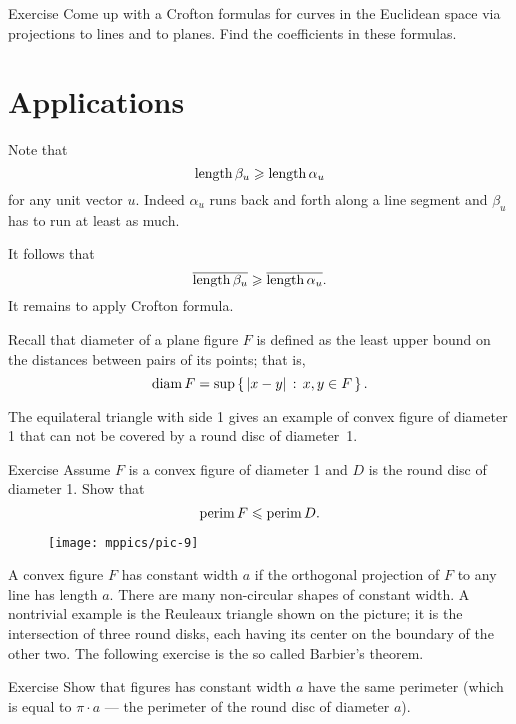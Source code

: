 \begin{thm}{Exercise}
Come up with a Crofton formulas for curves in the Euclidean space via projections to lines and to planes.
Find the coefficients in these formulas.
\end{thm}

\section{Applications}

Note that 
\[\mathop{\rm length}\nolimits \beta_u\geqslant \mathop{\rm length}\nolimits \alpha_u\]
for any unit vector $u$.
Indeed $\alpha_u$ runs back and forth along a line segment and $\beta_u$ has to run at least as much.

It follows that 
\[\overline{\mathop{\rm length}\nolimits \beta_u}\geqslant \overline{\mathop{\rm length}\nolimits \alpha_u}.\]
It remains to apply Crofton formula.
\qeds


Recall that diameter of a plane figure $F$ is defined as the least upper bound on the distances between pairs of its points;
that is,
\[\mathop{\rm diam}\nolimits F=\sup\left\{\,{|x-y|}\,:\,{x,y\in F}\,\right\}.\]

The equilateral triangle with side 1 gives an example of convex figure of diameter 1 that can not be covered by a round disc of diameter~1.

\begin{thm}{Exercise} 
Assume $F$ is a convex figure of diameter 1 and $D$ is the round disc of diameter 1.
Show that
\[\mathop{\rm perim}\nolimits F\leqslant \mathop{\rm perim}\nolimits D.\]
\end{thm}

\begin{wrapfigure}{r}{33 mm}
\vskip-5mm
\centering
\texttt{[image: mppics/pic-9]}
\end{wrapfigure}

A convex figure $F$ has constant width $a$ if the orthogonal projection of $F$ to any line has length $a$.
There are many non-circular shapes of constant width. 
A nontrivial example is the Reuleaux triangle shown on the picture;
it is the intersection of three round disks, each having its center on the boundary of the other two.
The following exercise is the so called Barbier's theorem.

\begin{thm}{Exercise} 
Show that figures has constant width $a$ have the same perimeter (which is equal to $\pi\cdot a$ --- the perimeter of the round disc of diameter $a$).
\end{thm}

